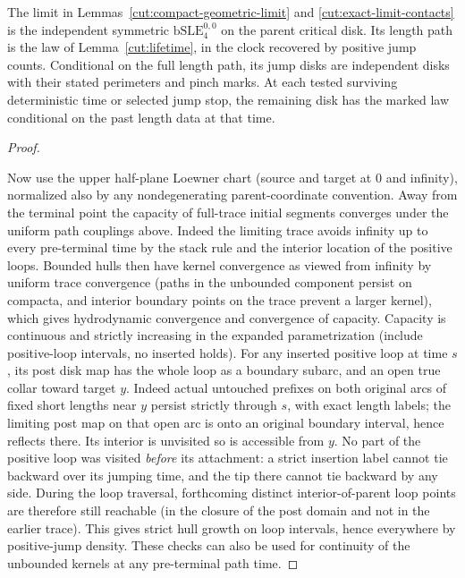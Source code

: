 \begin{lemma}
\label{cut:limit-identification}
The limit in Lemmas~\ref{cut:compact-geometric-limit} and
\ref{cut:exact-limit-contacts} is the independent symmetric
$\mathrm{bSLE}^{0,0}_4$ on the parent critical disk.  Its length path is
the law of Lemma~\ref{cut:lifetime}, in the clock recovered by positive
jump counts.  Conditional on the full length path, its jump disks are
independent disks with their stated perimeters and pinch marks.  At each
tested surviving deterministic time or selected jump stop, the remaining
disk has the marked law conditional on the past length data at that time.
\end{lemma}
\begin{proof}
\label{cut:driver-clock}

Now use the upper half-plane Loewner chart (source and target at 0 and infinity), normalized also by any nondegenerating parent-coordinate convention.
Away from the terminal point the capacity of full-trace initial segments converges under the uniform path couplings above.
Indeed the limiting trace avoids infinity up to every pre-terminal time by the stack rule and the interior location of the positive loops.
Bounded hulls then have kernel convergence as viewed from infinity by uniform trace convergence (paths in the unbounded component persist on compacta, and interior boundary points on the trace prevent a larger kernel), which gives hydrodynamic convergence and convergence of capacity.
Capacity is continuous and strictly increasing in the expanded parametrization (include positive-loop intervals, no inserted holds).
For any inserted positive loop at time \(s\), its post disk map has the whole loop as a boundary subarc, and an open true collar toward target \(y\).
Indeed actual untouched prefixes on both original arcs of fixed short lengths near \(y\) persist strictly through \(s\), with exact length labels; the limiting post map on that open arc is onto an original boundary interval, hence reflects there.
Its interior is unvisited so is accessible from \(y\).
No part of the positive loop was visited \emph{before} its attachment: a strict insertion label cannot tie backward over its jumping time, and the tip there cannot tie backward by any side.
During the loop traversal, forthcoming distinct interior-of-parent loop points are therefore still reachable (in the closure of the post domain and not in the earlier trace).
This gives strict hull growth on loop intervals, hence everywhere by positive-jump density.
These checks can also be used for continuity of the unbounded kernels at any pre-terminal path time.


\end{proof}
